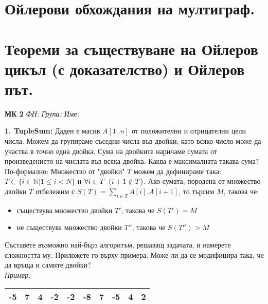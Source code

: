 \documentclass[fleqn,12pt]{article}
\begin{document}
\begin{flushleft}
\section{Ойлерови обхождания на мултиграф.}
\section{Теореми за съществуване на Ойлеров цикъл (с доказателство) и Ойлеров път.}

\textbf{МК 2} \hspace{5mm}\textit{ФН:} \hspace{5mm} \hspace{20mm} \textit{Група: } \hspace{10mm} \textit{Име: } \\
\vspace{5mm}

\textbf{1. TupleSum:} Даден е масив $A[1..n]$ от положителни и отрицателни цели числа. Можем да групираме съседни числа във двойки, като всяко число може да участва в точно една двойка. Сума на двойките наричаме сумата от произведението на числата във всяка двойка. Каква е максималната такава сума? \\

По-формално: Множество от "двойки" \hspace{1mm} $T$ можем да дефинираме така: $T \subset \{ i \in \mathbb{N} | 1 \leq i < N \}$ и $\forall i \in T \hspace{2mm} (i + 1 \notin T)$. Ако сумата, породена от множество двойки $T$ отбележим с $S(T) = \sum_{i \in T} A[i] . A[i+1]$, то търсим $M$, такова че:

\begin{itemize}
	\item съществува множество двойки $T'$, такова че $S(T')=M$
	\item не съществува множество двойки $T''$, такова че $S(T'') > M$
\end{itemize}

Съставете възможно най-бърз алгоритъм, решаващ задачата, и намерете сложността му. Приложете го върху примера. Може ли да се модифицира така, че да връща и самите двойки? \\
\vspace{5mm}
\textit{Пример: } \begin{tabular}{|c|c|c|c|c|c|c|c|c|c|} \hline -5 & 7 & 4 & -2 & -2 & -8 & 7 & -5 & 4 & 2 \\ \hline \end{tabular}


\end{flushleft}
\end{document}
